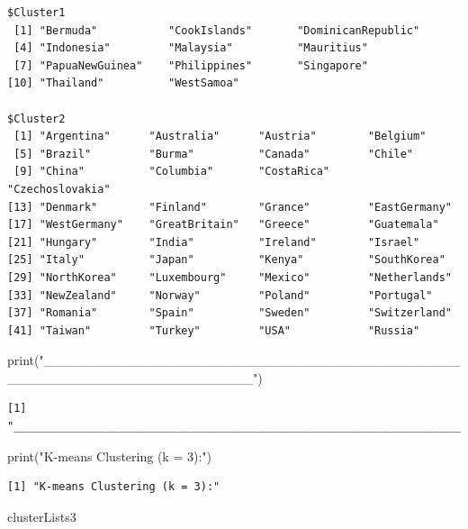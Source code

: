 \documentclass[
  letterpaper,
  DIV=11,
  numbers=noendperiod]{scrartcl}
\newenvironment{Shaded}{}{}
\newcommand{\FunctionTok}[1]{\textcolor[rgb]{0.41,0.62,0.42}{#1}}
\newcommand{\NormalTok}[1]{\textcolor[rgb]{0.24,0.22,0.21}{#1}}
\newcommand{\StringTok}[1]{\textcolor[rgb]{0.60,0.59,0.10}{#1}}
\begin{document}
\begin{verbatim}
$Cluster1
 [1] "Bermuda"           "CookIslands"       "DominicanRepublic"
 [4] "Indonesia"         "Malaysia"          "Mauritius"        
 [7] "PapuaNewGuinea"    "Philippines"       "Singapore"        
[10] "Thailand"          "WestSamoa"        

$Cluster2
 [1] "Argentina"      "Australia"      "Austria"        "Belgium"       
 [5] "Brazil"         "Burma"          "Canada"         "Chile"         
 [9] "China"          "Columbia"       "CostaRica"      "Czechoslovakia"
[13] "Denmark"        "Finland"        "Grance"         "EastGermany"   
[17] "WestGermany"    "GreatBritain"   "Greece"         "Guatemala"     
[21] "Hungary"        "India"          "Ireland"        "Israel"        
[25] "Italy"          "Japan"          "Kenya"          "SouthKorea"    
[29] "NorthKorea"     "Luxembourg"     "Mexico"         "Netherlands"   
[33] "NewZealand"     "Norway"         "Poland"         "Portugal"      
[37] "Romania"        "Spain"          "Sweden"         "Switzerland"   
[41] "Taiwan"         "Turkey"         "USA"            "Russia"        
\end{verbatim}

\begin{Shaded}
\begin{Highlighting}[]
\FunctionTok{print}\NormalTok{(}\StringTok{"\_\_\_\_\_\_\_\_\_\_\_\_\_\_\_\_\_\_\_\_\_\_\_\_\_\_\_\_\_\_\_\_\_\_\_\_\_\_\_\_\_\_\_\_\_\_\_\_\_\_\_\_\_\_\_\_\_\_\_\_\_\_\_\_\_\_\_\_\_\_"}\NormalTok{)}
\end{Highlighting}
\end{Shaded}

\begin{verbatim}
[1] "______________________________________________________________________"
\end{verbatim}

\begin{Shaded}
\begin{Highlighting}[]
\FunctionTok{print}\NormalTok{(}\StringTok{"K{-}means Clustering (k = 3):"}\NormalTok{)}
\end{Highlighting}
\end{Shaded}

\begin{verbatim}
[1] "K-means Clustering (k = 3):"
\end{verbatim}

\begin{Shaded}
\begin{Highlighting}[]
\NormalTok{clusterLists3}
\end{Highlighting}
\end{Shaded}
\end{document}
